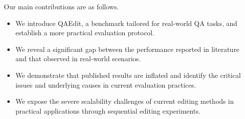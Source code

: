 Our main contributions are as follows.
\begin{itemize}[itemsep=0pt, leftmargin=18pt, topsep=1pt, partopsep=1pt, parsep=1pt]
\item We introduce QAEdit, a benchmark tailored for real-world QA tasks, and establish a more practical evaluation protocol.
\item We reveal a significant gap between the performance reported in literature and that observed in real-world scenarios.
\item We demonstrate that published results are inflated and identify the critical issues and underlying causes in current evaluation practices. %
\item We expose the severe scalability challenges of current editing methods in practical applications through sequential editing experiments.
\end{itemize}

